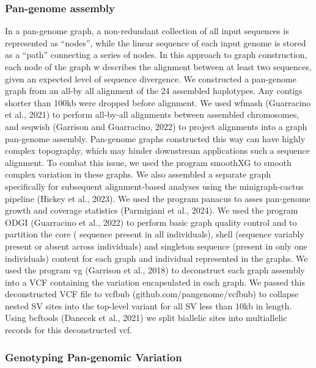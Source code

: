 \documentclass[
]{agujournal2019}
\begin{document}
\subsubsection{Pan-genome assembly}\label{pan-genome-assembly}

In a pan-genome graph, a non-redundant collection of all input sequences
is represented as ``nodes'', while the linear sequence of each input
genome is stored as a ``path'' connecting a series of nodes. In this
approach to graph construction, each node of the graph w describes the
alignment between at least two sequences, given an expected level of
sequence divergence. We constructed a pan-genome graph from an all-by
all alignment of the 24 assembled haplotypes. Any contigs shorter than
100kb were dropped before alignment. We used wfmash (Guarracino et al.,
2021) to perform all-by-all alignments between assembled chromosomes,
and seqwish (Garrison and Guarracino, 2022) to project alignments into a
graph pan-genome assembly. Pan-genome graphs constructed this way can
have highly complex topography, which may hinder downstream applications
such a sequence alignment. To combat this issue, we used the program
smoothXG to smooth complex variation in these graphs. We also assembled
a separate graph specifically for subsequent alignment-based analyses
using the minigraph-cactus pipeline (Hickey et al., 2023). We used the
program panacus to asses pan-genome growth and coverage statistics
(Parmigiani et al., 2024). We used the program ODGI (Guarracino et al.,
2022) to perform basic graph quality control and to partition the core (
sequence present in all individuals), shell (sequence variably present
or absent across individuals) and singleton sequence (present in only
one individuals) content for each graph and individual represented in
the graphs. We used the program vg (Garrison et al., 2018) to
deconstruct each graph assembly into a VCF containing the variation
encapsulated in each graph. We passed this deconstructed VCF file to
vcfbub (github.com/pangenome/vcfbub) to collapse nested SV sites into
the top-level variant for all SV less than 10kb in length. Using
bcftools (Danecek et al., 2021) we split biallelic sites into
multiallelic records for this deconstructed vcf.

\subsubsection{Genotyping Pan-genomic
Variation}\label{genotyping-pan-genomic-variation}
\end{document}
